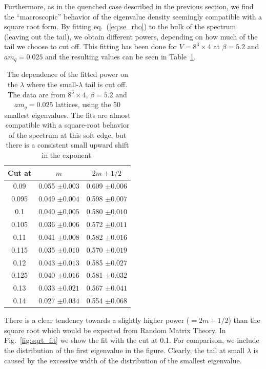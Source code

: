 \documentclass[11pt]{article}
\newcommand{\noi}{\vspace{12pt}\noindent}
\begin{document}
\noi
Furthermore, as in the quenched case described in the previous section, 
we find the ``macroscopic'' behavior
of the eigenvalue density seemingly compatible with a square root form.
By fitting eq.~(\ref{eq:se_rho}) to the bulk of the spectrum
(leaving out the tail), we obtain different powers, depending 
on how much of the tail we choose to cut off. This fitting has been 
done for $V=8^3\times 4$ at $\beta=5.2$ and $am_q=0.025$ and the 
resulting values can be seen in Table~\ref{tab:fit_vs_cut}.
\begin{table}
\begin{center}
\begin{tabular}{c c c}
Cut at & $m$ & $2m+1/2$\\
\hline
0.09  & 0.055 $\pm 0.003$ & 0.609 $\pm 0.006$ \\
0.095 & 0.049 $\pm 0.004$ & 0.598 $\pm 0.007$ \\
0.1   & 0.040 $\pm 0.005$ & 0.580 $\pm 0.010$ \\
0.105 & 0.036 $\pm 0.006$ & 0.572 $\pm 0.011$ \\
0.11  & 0.041 $\pm 0.008$ & 0.582 $\pm 0.016$ \\
0.115 & 0.035 $\pm 0.010$ & 0.570 $\pm 0.019$ \\
0.12  & 0.043 $\pm 0.013$ & 0.585 $\pm 0.027$ \\
0.125 & 0.040 $\pm 0.016$ & 0.581 $\pm 0.032$ \\
0.13  & 0.033 $\pm 0.021$ & 0.567 $\pm 0.041$ \\
0.14  & 0.027 $\pm 0.034$ & 0.554 $\pm 0.068$ \\
\hline
\end{tabular}
\end{center}
\caption[a]{The dependence of the fitted power on the
$\lambda$ where the small-$\lambda$ tail is cut off.
The data are from $8^3\times 4$, $\beta=5.2$ and $am_q=0.025$
lattices, using the 50 smallest eigenvalues. The fits are almost compatible
with a square-root behavior of the spectrum at this soft edge, but there
is a consistent small upward shift in the exponent.}
\label{tab:fit_vs_cut}
\end{table}
There is a clear tendency towards a slightly higher power ($=2m+1/2$)
than the square root which would be expected from Random Matrix Theory.
In Fig.~\ref{fig:sqrt_fit} we show the fit with the cut at 0.1.
For comparison, we include the distribution of the first eigenvalue in 
the figure.  Clearly, the tail at small $\lambda$ is caused by the
excessive width of the distribution of the smallest eigenvalue.
\end{document}
